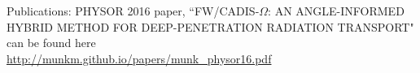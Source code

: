 \documentclass[12pt]{article}
\begin{document}
Publications: PHYSOR 2016 paper, ``FW/CADIS-$\Omega$: AN ANGLE-INFORMED HYBRID METHOD FOR DEEP-PENETRATION RADIATION TRANSPORT" can be found here\\ \href{http://munkm.github.io/papers/munk_physor16.pdf}{http://munkm.github.io/papers/munk\_physor16.pdf}





\appendix

\makeatletter
\def\@seccntformat#1{APPENDIX \csname the#1\endcsname.~}
\makeatother

%
%
%
\end{document}

